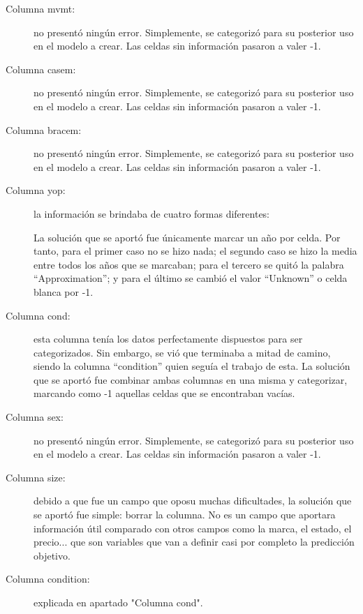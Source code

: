 \begin{description}
	\item[Columna mvmt:] no presentó ningún error. Simplemente, se categorizó para su posterior uso en el modelo a crear. Las celdas sin información pasaron a valer -1.
	\item[Columna casem:] no presentó ningún error. Simplemente, se categorizó para su posterior uso en el modelo a crear. Las celdas sin información pasaron a valer -1.
	\item[Columna bracem:] no presentó ningún error. Simplemente, se categorizó para su posterior uso en el modelo a crear. Las celdas sin información pasaron a valer -1.
	\item[Columna yop:] la información se brindaba de cuatro formas diferentes:
	La solución que se aportó fue únicamente marcar un año por celda. Por tanto, para el primer caso no se hizo nada; el segundo caso se hizo la media entre todos los años que se marcaban; para el tercero se quitó la palabra “Approximation”; y para el último se cambió el valor “Unknown” o celda blanca por -1.
	\item[Columna cond:] esta columna tenía los datos perfectamente dispuestos para ser categorizados. Sin embargo, se vió que terminaba a mitad de camino, siendo la columna “condition” quien seguía el trabajo de esta. La solución que se aportó fue combinar ambas columnas en una misma y categorizar, marcando como -1 aquellas celdas que se encontraban vacías.
	\item[Columna sex:] no presentó ningún error. Simplemente, se categorizó para su posterior uso en el modelo a crear. Las celdas sin información pasaron a valer -1.
	\item[Columna size:] debido a que fue un campo que oposu muchas dificultades, la solución que se aportó fue simple: borrar la columna. No es un campo que aportara información útil comparado con otros campos como la marca, el estado, el precio... que son variables que van a definir casi por completo la predicción objetivo.
	\item[Columna condition:] explicada en apartado "Columna cond".
\end{description}
	
